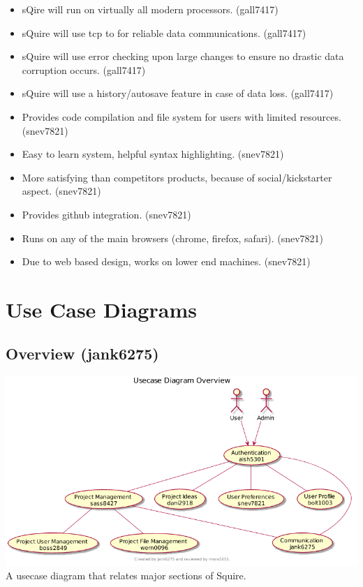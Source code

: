 \documentclass[11pt]{report}
\begin{document}
\begin{itemize}
        \item sQire will run on virtually all modern processors. (gall7417)
        \item sQuire will use tcp to for reliable data communications. (gall7417)
        \item sQuire will use error checking upon large changes to ensure no drastic data corruption occurs. (gall7417)
        \item sQuire will use a history/autosave feature in case of data loss. (gall7417)
        \item Provides code compilation and file system for users with limited resources. (snev7821)
        \item Easy to learn system, helpful syntax highlighting. (snev7821)
        \item More satisfying than competitors products, because of social/kickstarter aspect. (snev7821)
        \item Provides github integration. (snev7821)
        \item Runs on any of the main browsers (chrome, firefox, safari). (snev7821)
        \item Due to web based design, works on lower end machines. (snev7821)
    \end{itemize}


\chapter{Use Case Diagrams}
    \section{Overview (jank6275)}
        \includegraphics[width=\textwidth]{diagrams/usecase-overview}
        A usecase diagram that relates major sections of Squire.
\end{document}
